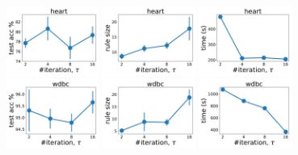 \begin{figure}
	\centering
	
	\subfloat
	{\includegraphics[width=0.27\textwidth]{figures/interpretability/relaxed-cnf/heart_test_accuracy_vary_iteration.pdf}}
	\subfloat
	{\includegraphics[width=0.27\textwidth]{figures/interpretability/relaxed-cnf/heart_rule_size_vary_iteration.pdf}}
	\subfloat
	{\includegraphics[width=0.27\textwidth]{figures/interpretability/relaxed-cnf/heart_time_vary_iteration.pdf}} 
	\\
	
	\subfloat
	{\includegraphics[width=0.27\textwidth]{figures/interpretability/relaxed-cnf/wdbc_test_accuracy_vary_iteration.pdf}}
	\subfloat
	{\includegraphics[width=0.27\textwidth]{figures/interpretability/relaxed-cnf/wdbc_rule_size_vary_iteration.pdf}}
	\subfloat
	{\includegraphics[width=0.27\textwidth]{figures/interpretability/relaxed-cnf/wdbc_time_vary_iteration.pdf}} 
	\\
	

\end{figure}
